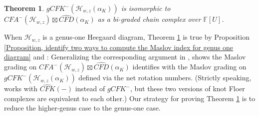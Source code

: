 \documentclass{amsart}
\newtheorem{thm}{Theorem}[section]
\theoremstyle{definition}
\theoremstyle{remark}
\numberwithin{equation}{section}
\numberwithin{equation}{section} \makeatletter
\begin{document}
\begin{thm}\label{Theorem, graded isomorphism of gCFKminus}
$gCFK^-(\mathcal{H}_{w,z}(\alpha_{K}))$ is isomorphic to ${CFA}^-(\mathcal{H}_{w,z})\boxtimes \widehat{CFD}(\alpha_K)$ as a bi-graded chain complex over $\mathbb{F}[U]$.
\end{thm}

 When $\mathcal{H}_{w,z}$ is a genus-one Heegaard diagram, Theorem \ref{Theorem, graded isomorphism of gCFKminus} is true by Proposition \ref{Proposition, identify two ways to compute the Maslov index for genus one diagram} and \cite[Theorem 1.2]{Chen2019}: Generalizing the corresponding argument in \cite{Hanselman2022},  \cite[Theorem 1.2]{Chen2019} shows the Maslov grading on ${CFA}^-(\mathcal{H}_{w,z})\boxtimes {\widehat{CFD}(\alpha_K)}$ identifies with the Maslov grading on $gCFK^-(\mathcal{H}_{w,z}(\alpha_{K}))$ defined via the net rotation numbers. (Strictly speaking, \cite{Chen2019} works with $\widehat{CFK}(-)$ instead of $gCFK^{-}$, but these two versions of knot Floer complexes are equivalent to each other.) Our strategy for proving Theorem \ref{Theorem, graded isomorphism of gCFKminus} is to reduce the higher-genus case to the genus-one case. 
 
\end{document}
